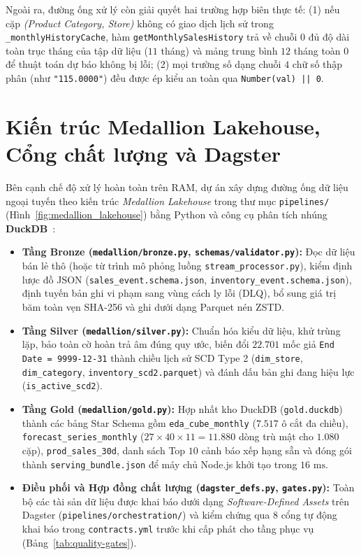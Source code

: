 Ngoài ra, đường ống xử lý còn giải quyết hai trường hợp biên thực tế: (1) nếu cặp \textit{(Product Category, Store)} không có giao dịch lịch sử trong \texttt{_monthlyHistoryCache}, hàm \texttt{getMonthlySalesHistory} trả về chuỗi $0$ đủ độ dài toàn trục tháng của tập dữ liệu ($11$ tháng) và mảng trung bình $12$ tháng toàn $0$ để thuật toán dự báo không bị lỗi; (2) mọi trường số dạng chuỗi $4$ chữ số thập phân (như \texttt{"115.0000"}) đều được ép kiểu an toàn qua \texttt{Number(val) || 0}.

\section{Kiến trúc Medallion Lakehouse, Cổng chất lượng và Dagster}
\label{sec:ch3-medallion}
Bên cạnh chế độ xử lý hoàn toàn trên RAM, dự án xây dựng đường ống dữ liệu ngoại tuyến theo kiến trúc \textit{Medallion Lakehouse} trong thư mục \texttt{pipelines/} (Hình~\ref{fig:medallion_lakehouse}) bằng Python và công cụ phân tích nhúng \textbf{DuckDB}~\cite{raasveldt2019duckdb}:
\begin{itemize}[topsep=0pt, itemsep=1pt]
	\item \textbf{Tầng Bronze (\texttt{medallion/bronze.py}, \texttt{schemas/validator.py}):} Đọc dữ liệu bán lẻ thô (hoặc từ trình mô phỏng luồng \texttt{stream_processor.py}), kiểm định lược đồ JSON (\texttt{sales_event.schema.json}, \texttt{inventory_event.schema.json}), định tuyến bản ghi vi phạm sang vùng cách ly lỗi (DLQ), bổ sung giá trị băm toàn vẹn SHA-256 và ghi dưới dạng Parquet nén ZSTD.
	\item \textbf{Tầng Silver (\texttt{medallion/silver.py}):} Chuẩn hóa kiểu dữ liệu, khử trùng lặp, bảo toàn cờ hoàn trả âm đúng quy ước, biến đổi $22.701$ mốc giả \texttt{End Date = 9999-12-31} thành chiều lịch sử SCD Type 2 (\texttt{dim_store}, \texttt{dim_category}, \texttt{inventory_scd2.parquet}) và đánh dấu bản ghi đang hiệu lực (\texttt{is_active_scd2}).
	\item \textbf{Tầng Gold (\texttt{medallion/gold.py}):} Hợp nhất kho DuckDB (\texttt{gold.duckdb}) thành các bảng Star Schema gồm \texttt{eda_cube_monthly} ($7.517$ ô cắt đa chiều), \texttt{forecast_series_monthly} ($27 \times 40 \times 11 = 11.880$ dòng trù mật cho $1.080$ cặp), \texttt{prod_sales_30d}, danh sách Top $10$ cảnh báo xếp hạng sẵn và đóng gói thành \texttt{serving_bundle.json} để máy chủ Node.js khởi tạo trong $16\text{ ms}$.
	\item \textbf{Điều phối và Hợp đồng chất lượng (\texttt{dagster_defs.py}, \texttt{gates.py}):} Toàn bộ các tài sản dữ liệu được khai báo dưới dạng \textit{Software-Defined Assets} trên Dagster (\texttt{pipelines/\allowbreak{}orchestration/}) và kiểm chứng qua $8$ cổng tự động khai báo trong \texttt{contracts.yml} trước khi cấp phát cho tầng phục vụ (Bảng~\ref{tab:quality-gates}).
\end{itemize}

